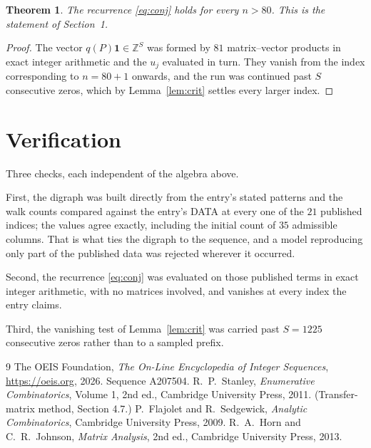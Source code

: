 \documentclass[11pt,a4paper]{article}
\theoremstyle{plain}
\newtheorem{theorem}{Theorem}
\theoremstyle{definition}
\begin{document}
\begin{theorem}
The recurrence \eqref{eq:conj} holds for every $n>80$. This is the statement of
Section~1.
\end{theorem}

\begin{proof}
The vector $q(P)\mathbf{1}\in\mathbb{Z}^{S}$ was formed by $81$ matrix--vector
products in exact integer arithmetic and the $u_j$ evaluated in turn. They vanish from the
index corresponding to $n=80+1$ onwards, and the run was continued past $S$ consecutive
zeros, which by Lemma~\ref{lem:crit} settles every larger index.
\end{proof}

\section{Verification}

Three checks, each independent of the algebra above.

First, the digraph was built directly from the entry's stated patterns and the walk counts
compared against the entry's DATA at every one of the $21$ published indices; the
values agree exactly, including the initial count of $35$ admissible columns. That is
what ties the digraph to the sequence, and a model reproducing only part of the published
data was rejected wherever it occurred.

Second, the recurrence \eqref{eq:conj} was evaluated on those published terms in exact
integer arithmetic, with no matrices involved, and vanishes at every index the entry claims.

Third, the vanishing test of Lemma~\ref{lem:crit} was carried past $S=1225$ consecutive
zeros rather than to a sampled prefix.

\begin{thebibliography}{9}
 The OEIS Foundation, \emph{The On-Line Encyclopedia of Integer
Sequences}, \url{https://oeis.org}, 2026. Sequence A207504.
 R.~P.~Stanley, \emph{Enumerative Combinatorics}, Volume 1, 2nd ed.,
Cambridge University Press, 2011. (Transfer-matrix method, Section 4.7.)
 P.~Flajolet and R.~Sedgewick, \emph{Analytic Combinatorics}, Cambridge
University Press, 2009.
 R.~A.~Horn and C.~R.~Johnson, \emph{Matrix Analysis}, 2nd ed., Cambridge
University Press, 2013.
\end{thebibliography}
\end{document}
